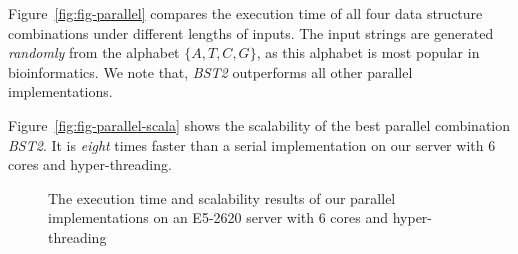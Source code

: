 Figure~\ref{fig:fig-parallel} compares the execution time of all four
data structure combinations under different lengths of inputs.  The
input strings are generated {\em randomly} from the alphabet $\{A, T,
C, G\}$, as this alphabet is most popular in bioinformatics.  We note
that, {\em BST2} outperforms all other parallel implementations. %

Figure~\ref{fig:fig-parallel-scala} shows the scalability of the best
parallel combination {\em BST2}.  It is {\em eight} times faster than
a serial implementation on our server with 6 cores and
hyper-threading.

\begin{figure}[!thb]
  \centering
  \caption{The execution time and scalability results of our parallel
    implementations on an E5-2620 server with 6 cores and
    hyper-threading}
\end{figure}
